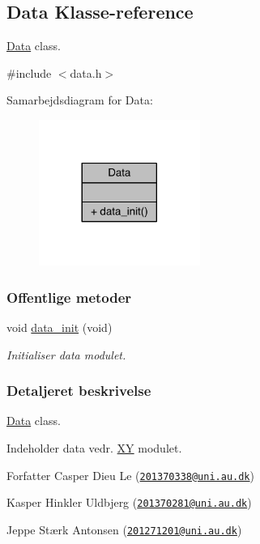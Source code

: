 \hypertarget{class_data}{}\subsection{Data Klasse-\/reference}
\label{class_data}


\hyperlink{class_data}{Data} class.  




{\ttfamily \#include $<$data.\+h$>$}



Samarbejdsdiagram for Data\+:\nopagebreak
\begin{figure}[H]
\begin{center}
\leavevmode
\includegraphics[width=149pt]{da/d91/class_data__coll__graph}
\end{center}
\end{figure}
\subsubsection*{Offentlige metoder}
\begin{DoxyCompactItemize}
\item 
void \hyperlink{class_data_adf37c815716edf228a3cbb4564290275}{data\+\_\+init} (void)
\begin{DoxyCompactList}\small\item\em Initialiser data modulet. \end{DoxyCompactList}\end{DoxyCompactItemize}


\subsubsection{Detaljeret beskrivelse}
\hyperlink{class_data}{Data} class. 

Indeholder data vedr. \hyperlink{class_x_y}{XY} modulet. \begin{DoxyAuthor}{Forfatter}
Casper Dieu Le (\href{mailto:201370338@uni.au.dk}{\tt 201370338@uni.\+au.\+dk}) 

Kasper Hinkler Uldbjerg (\href{mailto:201370281@uni.au.dk}{\tt 201370281@uni.\+au.\+dk}) 

Jeppe Stærk Antonsen (\href{mailto:201271201@uni.au.dk}{\tt 201271201@uni.\+au.\+dk}) 
\end{DoxyAuthor}


